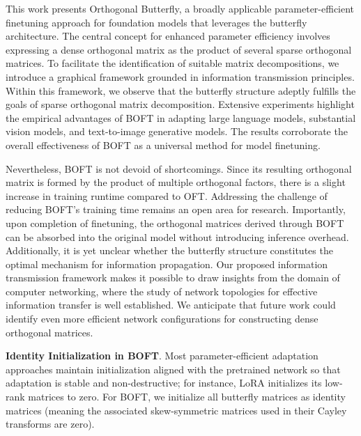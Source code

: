 This work presents Orthogonal Butterfly, a broadly applicable parameter-efficient finetuning approach for foundation models that leverages the butterfly architecture. The central concept for enhanced parameter efficiency involves expressing a dense orthogonal matrix as the product of several sparse orthogonal matrices. To facilitate the identification of suitable matrix decompositions, we introduce a graphical framework grounded in information transmission principles. Within this framework, we observe that the butterfly structure adeptly fulfills the goals of sparse orthogonal matrix decomposition. Extensive experiments highlight the empirical advantages of BOFT in adapting large language models, substantial vision models, and text-to-image generative models. The results corroborate the overall effectiveness of BOFT as a universal method for model finetuning.

Nevertheless, BOFT is not devoid of shortcomings. Since its resulting orthogonal matrix is formed by the product of multiple orthogonal factors, there is a slight increase in training runtime compared to OFT. Addressing the challenge of reducing BOFT’s training time remains an open area for research. Importantly, upon completion of finetuning, the orthogonal matrices derived through BOFT can be absorbed into the original model without introducing inference overhead. Additionally, it is yet unclear whether the butterfly structure constitutes the optimal mechanism for information propagation. Our proposed information transmission framework makes it possible to draw insights from the domain of computer networking, where the study of network topologies for effective information transfer is well established. We anticipate that future work could identify even more efficient network configurations for constructing dense orthogonal matrices.

\textbf{Identity Initialization in BOFT}. Most parameter-efficient adaptation approaches maintain initialization aligned with the pretrained network so that adaptation is stable and non-destructive; for instance, LoRA initializes its low-rank matrices to zero. For BOFT, we initialize all butterfly matrices as identity matrices (meaning the associated skew-symmetric matrices used in their Cayley transforms are zero).

